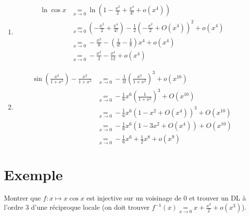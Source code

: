 \documentclass[../main.tex]{subfiles}
\begin{document}
\begin{enumerate}
    \item \begin{align*}
        \ln \cos x &\underset{x\to 0}{=} \ln \left( 1 - \frac{x^2}{2} + \frac{x^4}{4!} + o(x^4) \right) \\
        &\underset{x\to 0}{=} \left( -\frac{x^2}{2} + \frac{x^4}{4!} \right) - \frac{1}{2} \left( -\frac{x^2}{2} + O(x^4) \right)^2 + o(x^4) \\
        &\underset{x\to 0}{=} -\frac{x^2}{0} - \left( \frac{1}{4!} - \frac{1}{8} \right) x^4 + o(x^4) \\
        &\underset{x\to 0}{=} -\frac{x^2}{2} - \frac{x^4}{12} + o(x^4)
    \end{align*}
    \setcounter{enumi}{2}
    \item \begin{align*}
        \sin \left( \frac{x^2}{1 + x^2} \right) -\frac{x^2}{1 + x^2} &\underset{x\to 0}{=} -\frac{1}{3!} \left( \frac{x^2}{1 + x^2} \right)^3 + o(x^{10}) \\
        &\underset{x\to 0}{=} -\frac{1}{6} x^6 \left( \frac{1}{1 + x^2} \right)^3 + O(x^{10}) \\
        &\underset{x\to 0}{=} -\frac{1}{6} x^6 (1 - x^2 + O(x^4))^3 + O(x^{10}) \\
        &\underset{x\to 0}{=} -\frac{1}{6} x^6 (1 - 3x^2 + O(x^4)) + O(x^{10}) \\
        &\underset{x\to 0}{=} -\frac{1}{6} x^6 + \frac{1}{2} x^8 + o(x^9)
    \end{align*}
\end{enumerate}

\section{Exemple}
\begin{tcolorbox}[title=Exemple 25.63, title filled=false, colframe=darkgreen, colback=darkgreen!10!white]
    Montrer que $f:x\mapsto x \cos x$ est injective sur un voisinage de $0$ et trouver un DL à l'ordre 3 d'une réciproque locale (on doit trouver $f^{-1}(x) \underset{x\to 0}{=}  x + \frac{x^3}{2} + o(x^3)$).
\end{tcolorbox}
\end{document}

